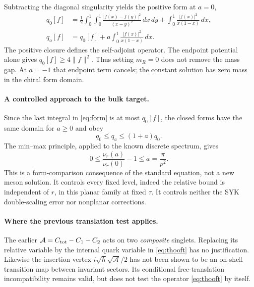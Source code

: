 \documentclass[11pt,a4paper]{article}
\newcommand{\Aop}{\mathcal A}
\begin{document}
Subtracting the diagonal singularity yields the positive form at $a=0$,
\begin{align}
 q_0[f]&=\frac12\int_0^1\!\!\int_0^1
       \frac{|f(x)-f(y)|^2}{(x-y)^2}\,dx\,dy
       +\int_0^1\frac{|f(x)|^2}{x(1-x)}\,dx,\label{eq:form}\\
 q_a[f]&=q_0[f]+a\int_0^1\frac{|f(x)|^2}{x(1-x)}\,dx.
\end{align}
The positive closure defines the self-adjoint operator. The endpoint
potential alone gives $q_0[f]\ge4\|f\|^2$. Thus setting $m_R=0$
does not remove the mass gap. At $a=-1$ that endpoint term cancels;
the constant solution has zero mass in the chiral form domain.

\paragraph{A controlled approach to the bulk target.}
Since the last integral in \eqref{eq:form} is at most $q_0[f]$,
the closed forms have the same domain for $a\ge0$ and obey
\begin{equation}
 q_0\le q_a\le(1+a)q_0.
\end{equation}
The min--max principle, applied to the known discrete spectrum, gives
\begin{equation}
 \boxed{0\le\frac{\nu_r(a)}{\nu_r(0)}-1\le a=\frac{\pi}{p^2}.}
 \label{eq:bound}
\end{equation}
This is a form-comparison consequence of the standard equation, not a
new meson solution. It controls every fixed level, indeed the relative
bound is independent of $r$, in this planar family at fixed $\tau$.
It controls neither the SYK double-scaling error nor nonplanar corrections.

\paragraph{Where the previous translation test applies.}
The earlier $\Aop=C_{\rm tot}-C_1-C_2$ acts on two \emph{composite}
singlets. Replacing its relative variable by the internal quark variable
in \eqref{eq:thooft} has no justification. Likewise the insertion vertex
$i\sqrt{h}\sqrt{\Aop}/2$ has not been shown to be an on-shell transition
map between invariant sectors. Its conditional free-translation
incompatibility remains valid, but does not test the operator
\eqref{eq:thooft} by itself.

\newpage
\end{document}
